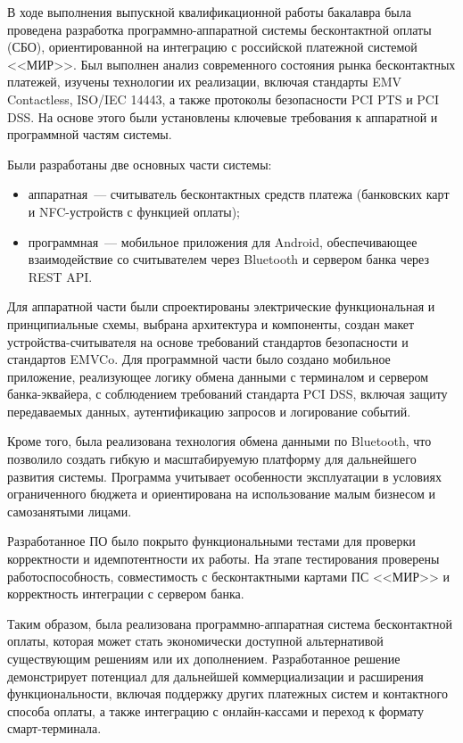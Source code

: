 \newpage


В ходе выполнения выпускной квалификационной работы бакалавра была проведена разработка программно-аппаратной системы бесконтактной оплаты (СБО), ориентированной на интеграцию с российской платежной системой <<МИР>>.
Был выполнен анализ современного состояния рынка бесконтактных платежей, изучены технологии их реализации, включая стандарты EMV Contactless, ISO/IEC 14443, а также протоколы безопасности PCI PTS и PCI DSS.
На основе этого были установлены ключевые требования к аппаратной и программной частям системы.

Были разработаны две основных части системы:
\begin{itemize}
    \item аппаратная~--- считыватель бесконтактных средств платежа (банковских карт и NFC-устройств с функцией оплаты);
    \item программная~--- мобильное приложения для Android, обеспечивающее взаимодействие со считывателем через Bluetooth и сервером банка через REST API.
\end{itemize}

Для аппаратной части были спроектированы электрические функциональная и принципиальные схемы, выбрана архитектура и компоненты, создан макет устройства-считывателя на основе требований стандартов безопасности и стандартов EMVCo.
Для программной части было создано мобильное приложение, реализующее логику обмена данными с терминалом и сервером банка-эквайера, с соблюдением требований стандарта PCI DSS, включая защиту передаваемых данных, аутентификацию запросов и логирование событий.

Кроме того, была реализована технология обмена данными по Bluetooth, что позволило создать гибкую и масштабируемую платформу для дальнейшего развития системы.
Программа учитывает особенности эксплуатации в условиях ограниченного бюджета и ориентирована на использование малым бизнесом и самозанятыми лицами.

Разработанное ПО было покрыто функциональными тестами для проверки корректности и идемпотентности их работы.
На этапе тестирования проверены работоспособность, совместимость с бесконтактными картами ПС <<МИР>> и корректность интеграции с сервером банка.

Таким образом, была  реализована программно-аппаратная система бесконтактной оплаты, которая может стать экономически доступной альтернативой существующим решениям или их дополнением.
Разработанное решение демонстрирует потенциал для дальнейшей коммерциализации и расширения функциональности, включая поддержку других платежных систем и контактного способа оплаты, а также интеграцию с онлайн-кассами и переход к формату смарт-терминала.
